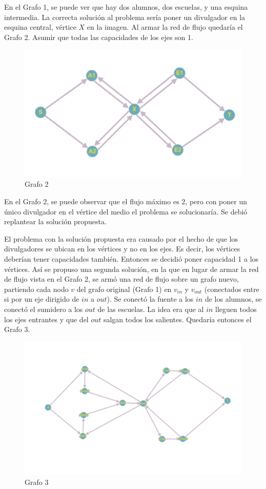En el Grafo 1, se puede ver que hay dos alumnos, dos escuelas, y una esquina intermedia. La correcta solución al problema sería poner un divulgador en la esquina central, vértice $X$ en la imagen. Al armar la red de flujo quedaría el Grafo 2. Asumir que todas las capacidades de los ejes son 1.

\begin{figure}[H]
\centering
\includegraphics[width=15cm]{Imagenes/Ej1c.png}
\caption{Grafo 2}
\end{figure}

En el Grafo 2, se puede observar que el flujo máximo es 2, pero con poner un único divulgador en el vértice del medio el problema se solucionaría. Se debió replantear la solución propuesta.

El problema con la solución propuesta era causado por el hecho de que los divulgadores se ubican en los vértices y no en los ejes. Es decir, los vértices deberían tener capacidades también. Entonces se decidió poner capacidad 1 a los vértices. Así se propuso una segunda solución, en la que en lugar de armar la red de flujo vista en el Grafo 2, se armó una red de flujo sobre un grafo nuevo, partiendo cada nodo $v$ del grafo original (Grafo 1) en $v_{in}$ y $v_{out}$ (conectados entre si por un eje dirigido de $in$ a $out$). Se conectó la fuente a los $in$ de los alumnos, se conectó el sumidero a los $out$ de las escuelas. La idea era que al $in$ lleguen todos los ejes entrantes y que del $out$ salgan todos los salientes. Quedaría entonces el Grafo 3.

\begin{figure}[H]
\centering
\includegraphics[width=15cm]{Imagenes/Ej1b.png}
\caption{Grafo 3}
\end{figure}

